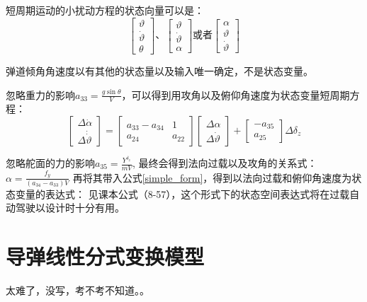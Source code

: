 短周期运动的小扰动方程的状态向量可以是：
\begin{equation*}
    \left[
    \begin{smallmatrix}
        \vartheta \\
        \dot{\vartheta} \\
        \theta
    \end{smallmatrix}    
    \right]
    、
    \left[
    \begin{smallmatrix}
        \vartheta \\
        \dot{\vartheta} \\
        \alpha
    \end{smallmatrix}    
    \right]
    或者
    \left[
        \begin{smallmatrix}
            \alpha\\
            \vartheta \\
            \dot{\vartheta}
        \end{smallmatrix}    
        \right]
\end{equation*}


弹道倾角角速度以有其他的状态量以及输入唯一确定，不是状态变量。

忽略重力的影响$a_{33}=\frac{g\sin\theta}{V}$，可以得到用攻角以及俯仰角速度为状态变量短周期方程：
\begin{equation}
    \left[
        \begin{smallmatrix}
            \Delta\dot{\alpha}\\
            \Delta\dot{\dot{\vartheta}}
        \end{smallmatrix}
    \right] = 
    \left[
    \begin{smallmatrix}
        a_{33}-a_{34} &1\\
        a_{24} &a_{22}
    \end{smallmatrix}
    \right]
    \left[
    \begin{smallmatrix}
        \Delta{\alpha}\\
        \Delta{\dot{\vartheta}}
    \end{smallmatrix}
    \right]+
    \left[
    \begin{smallmatrix}
        -a_{35}\\
        a_{25}
    \end{smallmatrix}
    \right]
    \Delta\delta_z
    \label{simple_form}
\end{equation}

忽略舵面的力的影响$a_{35}=\frac{Y^{\delta_z}}{mV}$,
最终会得到法向过载以及攻角的关系式：$\alpha =\frac{f_y}{(a_{34}-a_{33})V}$
再将其带入公式\eqref{simple_form}，得到以法向过载和俯仰角速度为状态变量的表达式：
见课本公式（8-57），这个形式下的状态空间表达式将在过载自动驾驶以设计时十分有用。
\section{导弹线性分式变换模型}
太难了，没写，考不考不知道。。